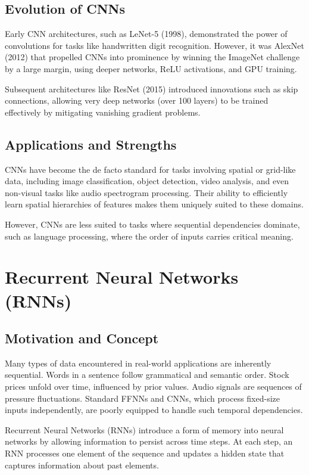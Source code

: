 \documentclass[openany]{book}
\begin{document}
\subsection{Evolution of CNNs}

Early CNN architectures, such as LeNet-5 (1998), demonstrated the power of 
convolutions for tasks like handwritten digit recognition. However, it was 
AlexNet (2012) that propelled CNNs into prominence by winning the ImageNet 
challenge by a large margin, using deeper networks, ReLU activations, and GPU 
training.

Subsequent architectures like ResNet (2015) introduced innovations such as skip 
connections, allowing very deep networks (over 100 layers) to be trained 
effectively by mitigating vanishing gradient problems.

\subsection{Applications and Strengths}

CNNs have become the de facto standard for tasks involving spatial or grid-like 
data, including image classification, object detection, video analysis, and even
non-visual tasks like audio spectrogram processing. Their ability to efficiently 
learn spatial hierarchies of features makes them uniquely suited to these 
domains.

However, CNNs are less suited to tasks where sequential dependencies dominate, 
such as language processing, where the order of inputs carries critical meaning.

\section{Recurrent Neural Networks (RNNs)}

\subsection{Motivation and Concept}

Many types of data encountered in real-world applications are inherently 
sequential. Words in a sentence follow grammatical and semantic order. Stock 
prices unfold over time, influenced by prior values. Audio signals are sequences
 of pressure fluctuations. Standard FFNNs and CNNs, which process fixed-size 
 inputs independently, are poorly equipped to handle such temporal dependencies.

Recurrent Neural Networks (RNNs) introduce a form of memory into neural networks 
by allowing information to persist across time steps. At each step, an RNN 
processes one element of the sequence and updates a hidden state that captures 
information about past elements.
\end{document}
